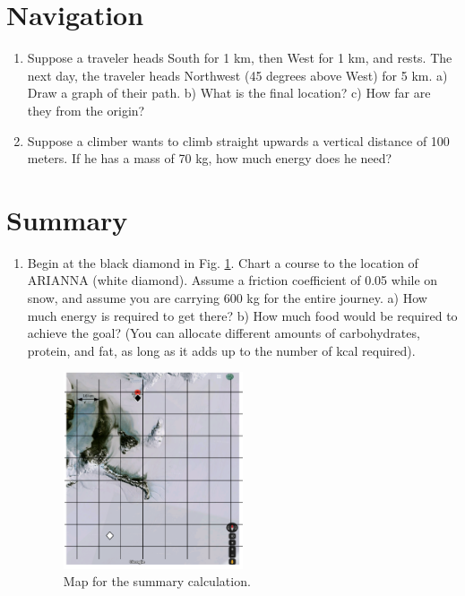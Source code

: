 \documentclass[10pt]{article}
\begin{document}
\section{Navigation}

\begin{enumerate}
\item Suppose a traveler heads South for 1 km, then West for 1 km, and rests.  The next day, the traveler heads Northwest (45 degrees above West) for 5 km.  a) Draw a graph of their path.  b) What is the final location?  c) How far are they from the origin? \\ \vspace{4cm}
\item Suppose a climber wants to climb straight upwards a vertical distance of 100 meters.  If he has a mass of 70 kg, how much energy does he need? \\ \vspace{2cm}
\end{enumerate}

\section{Summary}

\begin{enumerate}
\item Begin at the black diamond in Fig. \ref{fig:maze}.  Chart a course to the location of ARIANNA (white diamond). Assume a friction coefficient of 0.05 while on snow, and assume you are carrying 600 kg for the entire journey.  a) How much energy is required to get there? b) How much food would be required to achieve the goal?  (You can allocate different amounts of carbohydrates, protein, and fat, as long as it adds up to the number of kcal required). 
\begin{figure}[hb]
\centering
\includegraphics[width=0.5\textwidth]{glacier3.pdf}
\caption{\label{fig:maze} Map for the summary calculation.}
\end{figure}
\end{enumerate}
\end{document}
